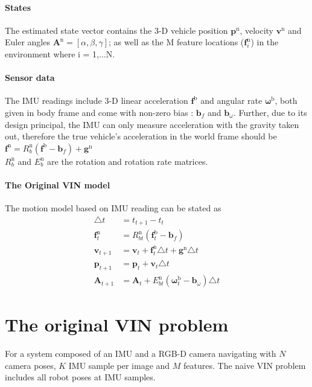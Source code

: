 \documentclass[12pt]{article}   %
\begin{document}
\paragraph{States}
The estimated state vector contains the 3-D vehicle position $\bm{p}^{\mathrm{n}}$, velocity $\bm{v}^{\mathrm{n}}$ and Euler angles $\bm{A}^{\mathrm{n}}=[\alpha,\beta,\gamma]$; as well as the M feature locations ($\bm{f}_i^{\mathrm{n}}$) in the environment where i = 1,...N. 
\paragraph{Sensor data}
The IMU readings include 3-D linear acceleration $\bm{f}^{\mathrm{b}}$ and angular rate $\bm{\omega}^{\mathrm{b}}$, both given in body frame and come with non-zero bias : $\bm{b}_f$ and $\bm{b}_\omega$. \newline
Further, due to its design principal, the IMU can only measure acceleration with the gravity taken out, therefore the true vehicle's acceleration in the world frame should be \\
$\bm{f}^{\mathrm{n}} = R_b^{\mathrm{n}}( \bm{f}^{\mathrm{b}}-\bm{b}_f ) + \bm{g}^{\mathrm{n}}$ \\
$R_b^{\mathrm{n}}$ and $E_b^{\mathrm{n}}$ are the rotation and rotation rate matrices.

\paragraph{The Original VIN model}
The motion model based on IMU reading can be stated as
\begin{align*}
	\triangle t & =  t_{t+1} - t_t \\
	\bm{f}_t^{\mathrm{n}} & = R_{bt}^{\mathrm{n}}  (\bm{f}_t^{\mathrm{b}} - \bm{b}_f) \\
	\bm{v}_{t+1} & = \bm{v}_{t} + \bm{f}_t^{\mathrm{n}} \triangle t + \bm{g}^{\mathrm{n}} \triangle t \\
	\bm{p}_{t+1} & = \bm{p}_{t} + \bm{v}_t \triangle t \\
	\bm{A}_{t+1} & = \bm{A}_t + E_{bt}^{\mathrm{n}}  (\bm{\omega}_t^{\mathrm{b}} - \bm{b}_\omega) \triangle t
\end{align*}

\section{The original VIN problem}
For a system composed of an IMU and a RGB-D camera navigating with $N$ camera poses, $K$ IMU sample per image and $M$ features. The naive VIN problem includes all robot poses at IMU samples.
\end{document}
